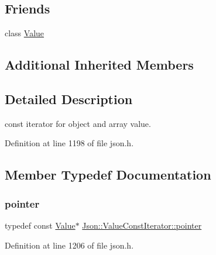 \subsection*{Friends}
\begin{DoxyCompactItemize}
\item 
class \hyperlink{class_json_1_1_value_const_iterator_aeceedf6e1a7d48a588516ce2b1983d6f}{Value}
\end{DoxyCompactItemize}
\subsection*{Additional Inherited Members}


\subsection{Detailed Description}
const iterator for object and array value. 



Definition at line 1198 of file json.\+h.



\subsection{Member Typedef Documentation}
\mbox{\label{class_json_1_1_value_const_iterator_a400136bd8bc09e9fddec0785fa2cff14}} 
\subsubsection{\texorpdfstring{pointer}{pointer}}
{\footnotesize\ttfamily typedef const \hyperlink{class_json_1_1_value}{Value}$\ast$ \hyperlink{class_json_1_1_value_const_iterator_a400136bd8bc09e9fddec0785fa2cff14}{Json\+::\+Value\+Const\+Iterator\+::pointer}}



Definition at line 1206 of file json.\+h.

\mbox{\label{class_json_1_1_value_const_iterator_aa9b05c6a37cd352ea1ee6e13b816f709}} 

